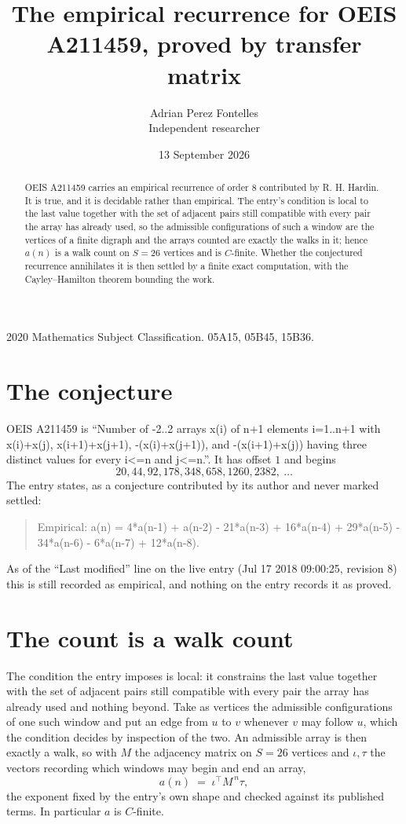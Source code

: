\documentclass[11pt,a4paper]{article}
\title{The empirical recurrence for OEIS A211459, proved by transfer matrix}
\author{Adrian Perez Fontelles\\ \small Independent researcher}
\date{13 September 2026}
\theoremstyle{plain}
\theoremstyle{definition}
\begin{document}
\maketitle

\begin{abstract}
OEIS A211459 carries an empirical recurrence of order $8$ contributed by R. H. Hardin. It is
true, and it is decidable rather than empirical. The entry's condition is local to the last value together with the set of adjacent pairs still compatible with every pair the array has already used, so
the admissible configurations of such a window are the vertices of a finite digraph and the
arrays counted are exactly the walks in it; hence $a(n)$ is a walk count on $S=26$ vertices
and is $C$-finite. Whether the conjectured recurrence annihilates it is then settled by a
finite exact computation, with the Cayley--Hamilton theorem bounding the work.
\end{abstract}

\noindent\small 2020 Mathematics Subject Classification. 05A15, 05B45, 15B36.\normalsize

\section{The conjecture}

OEIS A211459 is ``Number of -2..2 arrays x(i) of n+1 elements i=1..n+1 with x(i)+x(j), x(i+1)+x(j+1), -(x(i)+x(j+1)), and -(x(i+1)+x(j)) having three distinct values for every i<=n and j<=n.''. It has offset $1$ and begins
\[
20, 44, 92, 178, 348, 658, 1260, 2382,\ \dots
\]
The entry states, as a conjecture contributed by its author and never marked settled:
\begin{quote}
Empirical: a(n) = 4*a(n-1) + a(n-2) - 21*a(n-3) + 16*a(n-4) + 29*a(n-5) - 34*a(n-6) - 6*a(n-7) + 12*a(n-8).
\end{quote}
As of the ``Last modified'' line on the live entry (Jul 17 2018 09:00:25, revision 8) this is still
recorded as empirical, and nothing on the entry records it as proved.

\section{The count is a walk count}

The condition the entry imposes is local: it constrains the last value together with the set of adjacent pairs still compatible with every pair the array has already used and nothing beyond. Take as
vertices the admissible configurations of one such window and put an edge from $u$ to $v$
whenever $v$ may follow $u$, which the condition decides by inspection of the two. An
admissible array is then exactly a walk, so with $M$ the adjacency matrix on $S=26$ vertices
and $\iota,\tau$ the vectors recording which windows may begin and end an array,
\[
a(n)\;=\;\iota^{\!\top}M^{\,n}\tau ,
\]
the exponent fixed by the entry's own shape and checked against its published terms. In
particular $a$ is $C$-finite.
\end{document}
